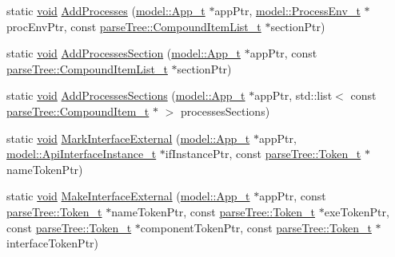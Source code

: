 \begin{DoxyCompactItemize}
\item 
static \hyperlink{_t_e_m_p_l_a_t_e__cdef_8h_ac9c84fa68bbad002983e35ce3663c686}{void} \hyperlink{namespacemodeller_ac4df63e20fe674bf950c932be599e396}{Add\+Processes} (\hyperlink{structmodel_1_1_app__t}{model\+::\+App\+\_\+t} $\ast$app\+Ptr, \hyperlink{structmodel_1_1_process_env__t}{model\+::\+Process\+Env\+\_\+t} $\ast$proc\+Env\+Ptr, const \hyperlink{structparse_tree_1_1_compound_item_list__t}{parse\+Tree\+::\+Compound\+Item\+List\+\_\+t} $\ast$section\+Ptr)
\item 
static \hyperlink{_t_e_m_p_l_a_t_e__cdef_8h_ac9c84fa68bbad002983e35ce3663c686}{void} \hyperlink{namespacemodeller_a79d24f688ec5afd5f2d702824bcfebe6}{Add\+Processes\+Section} (\hyperlink{structmodel_1_1_app__t}{model\+::\+App\+\_\+t} $\ast$app\+Ptr, const \hyperlink{structparse_tree_1_1_compound_item_list__t}{parse\+Tree\+::\+Compound\+Item\+List\+\_\+t} $\ast$section\+Ptr)
\item 
static \hyperlink{_t_e_m_p_l_a_t_e__cdef_8h_ac9c84fa68bbad002983e35ce3663c686}{void} \hyperlink{namespacemodeller_afba03ad7a337ecc419d2b9e1a1f17bf8}{Add\+Processes\+Sections} (\hyperlink{structmodel_1_1_app__t}{model\+::\+App\+\_\+t} $\ast$app\+Ptr, std\+::list$<$ const \hyperlink{structparse_tree_1_1_compound_item__t}{parse\+Tree\+::\+Compound\+Item\+\_\+t} $\ast$ $>$ processes\+Sections)
\item 
static \hyperlink{_t_e_m_p_l_a_t_e__cdef_8h_ac9c84fa68bbad002983e35ce3663c686}{void} \hyperlink{namespacemodeller_abbcff4f373a3dfa827fc54f9ca685e87}{Mark\+Interface\+External} (\hyperlink{structmodel_1_1_app__t}{model\+::\+App\+\_\+t} $\ast$app\+Ptr, \hyperlink{structmodel_1_1_api_interface_instance__t}{model\+::\+Api\+Interface\+Instance\+\_\+t} $\ast$if\+Instance\+Ptr, const \hyperlink{structparse_tree_1_1_token__t}{parse\+Tree\+::\+Token\+\_\+t} $\ast$name\+Token\+Ptr)
\item 
static \hyperlink{_t_e_m_p_l_a_t_e__cdef_8h_ac9c84fa68bbad002983e35ce3663c686}{void} \hyperlink{namespacemodeller_a84205db0cd04e2e1b05044cb127bb0ab}{Make\+Interface\+External} (\hyperlink{structmodel_1_1_app__t}{model\+::\+App\+\_\+t} $\ast$app\+Ptr, const \hyperlink{structparse_tree_1_1_token__t}{parse\+Tree\+::\+Token\+\_\+t} $\ast$name\+Token\+Ptr, const \hyperlink{structparse_tree_1_1_token__t}{parse\+Tree\+::\+Token\+\_\+t} $\ast$exe\+Token\+Ptr, const \hyperlink{structparse_tree_1_1_token__t}{parse\+Tree\+::\+Token\+\_\+t} $\ast$component\+Token\+Ptr, const \hyperlink{structparse_tree_1_1_token__t}{parse\+Tree\+::\+Token\+\_\+t} $\ast$interface\+Token\+Ptr)

\end{DoxyCompactItemize}
